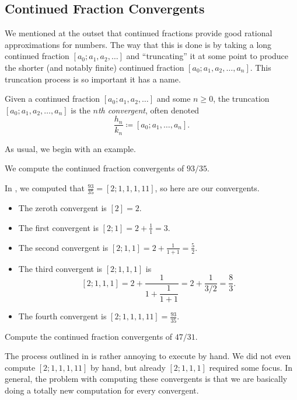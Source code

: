 \documentclass[../notes.tex]{subfiles}
\begin{document}
\subsection{Continued Fraction Convergents}
We mentioned at the outset that continued fractions provide good rational approximations for numbers. The way that this is done is by taking a long continued fraction $[a_0;a_1,a_2,\ldots]$ and ``truncating'' it at some point to produce the shorter (and notably finite) continued fraction $[a_0;a_1,a_2,\ldots,a_n]$. This truncation process is so important it has a name.
\begin{definition}[convergent]
	Given a continued fraction $[a_0;a_1,a_2,\ldots]$ and some $n\ge0$, the truncation $[a_0;a_1,a_2,\ldots,a_n]$ is the \textit{$n$th convergent}, often denoted
	\[\frac{h_n}{k_n}\coloneqq[a_0;a_1,\ldots,a_n].\]
\end{definition}
As usual, we begin with an example.
\begin{example} \label{ex:cf-convergents}
	We compute the continued fraction convergents of $93/35$.
\end{example}
\begin{solution}
	In , we computed that $\frac{93}{35}=[2;1,1,1,11]$, so here are our convergents.
	\begin{itemize}
		\item The zeroth convergent is $[2]=2$.
		\item The first convergent is $[2;1]=2+\frac11=3$.
		\item The second convergent is $[2;1,1]=2+\frac1{1+1}=\frac52$.
		\item The third convergent is $[2;1,1,1]$ is
		\[[2;1,1,1]=2+\dfrac1{1+\dfrac1{1+1}}=2+\frac1{3/2}=\frac83.\]
		\item The fourth convergent is $[2;1,1,1,11]=\frac{93}{35}$.
		\qedhere
	\end{itemize}
\end{solution}
\begin{exercise}
	Compute the continued fraction convergents of $47/31$.
\end{exercise}
The process outlined in  is rather annoying to execute by hand. We did not even compute $[2;1,1,1,11]$ by hand, but already $[2;1,1,1]$ required some focus. In general, the problem with computing these convergents is that we are basically doing a totally new computation for every convergent.
\end{document}
